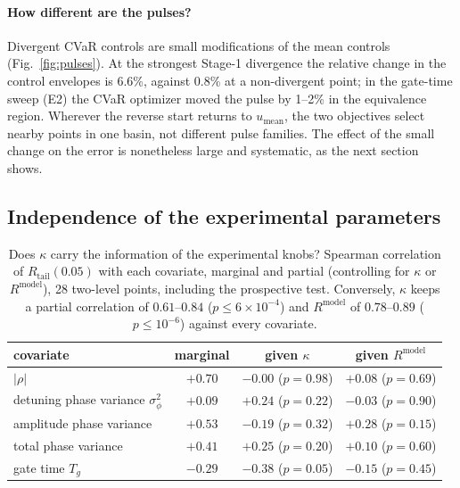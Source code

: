 \documentclass[aps,pra,onecolumn,notitlepage,superscriptaddress,nofootinbib,floatfix]{revtex4-2}
\newcommand{\Rt}{R_{\mathrm{tail}}}
\newcommand{\umean}{u_{\mathrm{mean}}}
\begin{document}
\paragraph{How different are the pulses?} Divergent CVaR controls are small
modifications of the mean controls (Fig.~\ref{fig:pulses}). At the strongest
Stage-1 divergence the relative change in the control envelopes is 6.6\%,
against 0.8\% at a non-divergent point; in the gate-time sweep (E2) the CVaR optimizer moved
the pulse by 1--2\% in the equivalence region. Wherever the reverse start
returns to $\umean$, the two objectives select nearby points in one basin,
not different pulse families. The effect of the
small change on the error is nonetheless large and systematic, as the next
section shows.


\label{sec:pulses}

\subsection{Independence of the experimental parameters}
\label{sec:independence}
\begin{table}[htbp]
\centering\small
\begin{tabular}{@{}lccc@{}}
\toprule
covariate & marginal & given $\kappa$ & given $R^{\mathrm{model}}$\\
\midrule
$|\rho|$ & $+0.70$ & $-0.00$ ($p=0.98$) & $+0.08$ ($p=0.69$)\\
detuning phase variance $\sigma_\phi^2$ & $+0.09$ & $+0.24$ ($p=0.22$) & $-0.03$ ($p=0.90$)\\
amplitude phase variance & $+0.53$ & $-0.19$ ($p=0.32$) & $+0.28$ ($p=0.15$)\\
total phase variance & $+0.41$ & $+0.25$ ($p=0.20$) & $+0.10$ ($p=0.60$)\\
gate time $T_g$ & $-0.29$ & $-0.38$ ($p=0.05$) & $-0.15$ ($p=0.45$)\\
\bottomrule
\end{tabular}
\caption{Does $\kappa$ carry the information of the experimental knobs?
Spearman correlation of $\Rt(0.05)$ with each covariate, marginal and partial
(controlling for $\kappa$ or $R^{\mathrm{model}}$), 28 two-level points,
including the prospective test. Conversely, $\kappa$ keeps a partial
correlation of $0.61$--$0.84$ ($p\le6\times10^{-4}$) and $R^{\mathrm{model}}$
of $0.78$--$0.89$ ($p\le10^{-6}$) against every covariate.}
\label{tab:independence}
\end{table}
\end{document}
